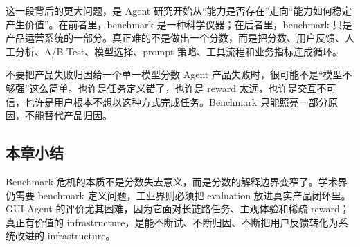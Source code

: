 这一段背后的更大问题，是 Agent 研究开始从“能力是否存在”走向“能力如何稳定产生价值”。在前者里，benchmark 是一种科学仪器；在后者里，benchmark 只是产品运营系统的一部分。真正难的不是做出一个分数，而是把分数、用户反馈、人工分析、A/B Test、模型选择、prompt 策略、工具流程和业务指标连成循环。

\begin{warningbox}{不要把产品失败归因给一个单一模型分数}
Agent 产品失败时，很可能不是“模型不够强”这么简单。也许是任务定义错了，也许是 reward 太远，也许是交互不可信，也许是用户根本不想以这种方式完成任务。Benchmark 只能照亮一部分原因，不能替代产品归因。
\end{warningbox}

\subsection{本章小结}

Benchmark 危机的本质不是分数失去意义，而是分数的解释边界变窄了。学术界仍需要 benchmark 定义问题，工业界则必须把 evaluation 放进真实产品闭环里。GUI Agent 的评价尤其困难，因为它面对长链路任务、主观体验和稀疏 reward；真正有价值的 infrastructure，是能不断试、不断归因、不断把用户反馈转化为系统改进的 infrastructure。

